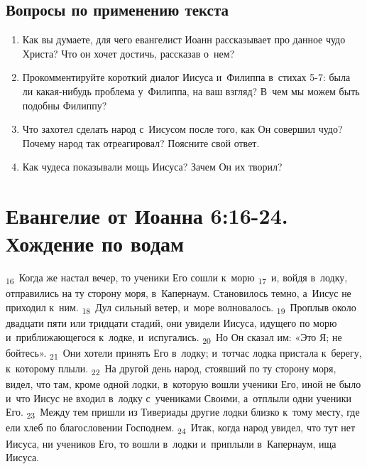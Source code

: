 \documentclass[a4paper,12pt]{article}
\begin{document}
\subsection*{Вопросы по применению текста} 
\begin{enumerate}
    \item Как вы думаете, для чего евангелист Иоанн рассказывает про данное чудо Христа? Что он хочет достичь, рассказав о~нем? 
    
    \myline
    
    \myline
    \item Прокомментируйте короткий диалог Иисуса и~Филиппа в~стихах 5-7: была ли какая-нибудь проблема у~Филиппа, на ваш взгляд? В~чем мы можем быть подобны Филиппу?
    
    \myline
    
    \myline
    \item Что захотел сделать народ с~Иисусом после того, как Он совершил чудо? Почему народ так отреагировал? Поясните свой ответ. 
    
    \myline
    
    \myline
    \item Как чудеса показывали мощь Иисуса? Зачем Он их творил? 
    
    \myline
    
    \myline
\end{enumerate}



\section{Евангелие от Иоанна 6:16-24. Хождение по водам}

\textsubscript{16}~Когда же настал вечер, то ученики Его сошли к~морю \textsubscript{17}~и, войдя в~лодку, отправились на ту сторону моря, в~Капернаум. Становилось темно, а~Иисус не приходил к~ним. \textsubscript{18}~Дул сильный ветер, и~море волновалось. \textsubscript{19}~Проплыв около двадцати пяти или тридцати стадий, они увидели Иисуса, идущего по морю и~приближающегося к~лодке, и~испугались. \textsubscript{20}~Но Он сказал им: «Это Я; не бойтесь». \textsubscript{21}~Они хотели принять Его в~лодку; и~тотчас лодка пристала к~берегу, к~которому плыли. \textsubscript{22}~На другой день народ, стоявший по ту сторону моря, видел, что там, кроме одной лодки, в~которую вошли ученики Его, иной не было и~что Иисус не входил в~лодку с~учениками Своими, а~отплыли одни ученики Его. \textsubscript{23}~Между тем пришли из Тивериады другие лодки близко к~тому месту, где ели хлеб по благословении Господнем. \textsubscript{24}~Итак, когда народ увидел, что тут нет Иисуса, ни учеников Его, то вошли в~лодки и~приплыли в~Капернаум, ища Иисуса.
\end{document}
